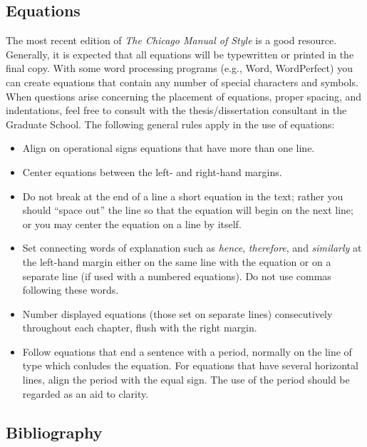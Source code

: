 \subsection{Equations}
\label{sec:Equations}

The most recent edition of \textit{The Chicago Manual of Style}
\cite{chicago1982} is a good resource. Generally, it is expected that
all equations will be typewritten or printed in the final copy. With
some word processing programs (e.g., Word, WordPerfect) you can create
equations that contain any number of special characters and symbols.
When questions arise concerning the placement of equations, proper
spacing, and indentations, feel free to consult with the
the\-sis/dis\-ser\-ta\-tion consultant in the Graduate School. The
following general rules apply in the use of equations:
\begin{itemize}
\item Align on operational signs equations that have more than one
  line.
\item Center equations between the left- and right-hand margins.
\item Do not break at the end of a line a short equation in the text;
  rather you should ``space out'' the line so that the equation will
  begin on the next line; or you may center the equation on a line by
  itself.
\item Set connecting words of explanation such as \textit{hence},
  \textit{therefore}, and \textit{similarly} at the left-hand margin
  either on the same line with the equation or on a separate line (if
  used with a numbered equations). Do not use commas following these
  words.
\item Number displayed equations (those set on separate lines)
  consecutively throughout each chapter, flush with the right margin.
\item Follow equations that end a sentence with a period, normally on
  the line of type which conludes the equation. For equations that
  have several horizontal lines, align the period with the equal sign.
  The use of the period should be regarded as an aid to clarity.
\end{itemize}

\subsection{Bibliography}
\label{sec:Bibliography}


